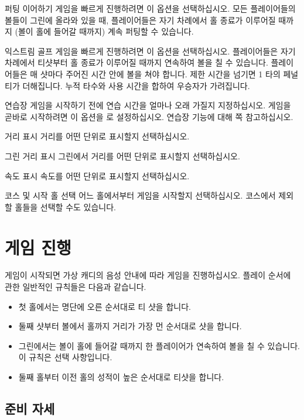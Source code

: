 \documentclass[10pt, openright, language=korean]{hzguide}
\begin{document}
\begin{UI}
\item[퍼팅 이어하기] 게임을 빠르게 진행하려면 이 옵션을 선택하십시오. 모든 플레이어들의 볼들이 그린에 올라와 있을 때, 플레이어들은 자기 차례에서 홀 종료가 이루어질 때까지 (볼이 홀에 들어갈 때까지) 계속 퍼팅할 수 있습니다.
\item[익스트림 골프] 게임을 빠르게 진행하려면 이 옵션을 선택하십시오. 플레이어들은 자기 차례에서 티샷부터 홀 종료가 이루어질 때까지 연속하여 볼을 칠 수 있습니다. 플레이어들은 매 샷마다 주어진 시간 안에 볼을 쳐야 합니다. 제한 시간을 넘기면 1 타의 페널티가 더해집니다. 누적 타수와 사용 시간을 합하여 우승자가 가려집니다.
\item[연습장] 게임을 시작하기 전에 연습 시간을 얼마나 오래 가질지 지정하십시오. 게임을 곧바로 시작하려면 이 옵션을 로 설정하십시오. 연습장 기능에 대해 \pageref{chp:practice_range} 쪽 \를 참고하십시오.
\item[거리 표시] 거리를 어떤 단위로 표시할지 선택하십시오.
\item[그린 거리 표시] 그린에서 거리를 어떤 단위로 표시할지 선택하십시오.
\item[속도 표시] 속도를 어떤 단위로 표시할지 선택하십시오.
\item[코스 및 시작 홀 선택] 어느 홀에서부터 게임을 시작할지 선택하십시오. 코스에서 제외할 홀들을 선택할 수도 있습니다.
\end{UI}

\chapter{게임 진행}

게임이 시작되면 가상 캐디의 음성 안내에 따라 게임을 진행하십시오.
플레이 순서에 관한 일반적인 규칙들은 다음과 같습니다.

\begin{itemize}
\item 첫 홀에서는 명단에 오른 순서대로 티 샷을 합니다.
\item 둘째 샷부터 볼에서 홀까지 거리가 가장 먼 순서대로 샷을 합니다.
\item 그린에서는 볼이 홀에 들어갈 때까지 한 플레이어가 연속하여 볼을 칠 수 있습니다. 이 규칙은 선택 사항입니다.
\item 둘째 홀부터 이전 홀의 성적이 높은 순서대로 티샷을 합니다.
\end{itemize}

\section{준비 자세}
\end{document}
